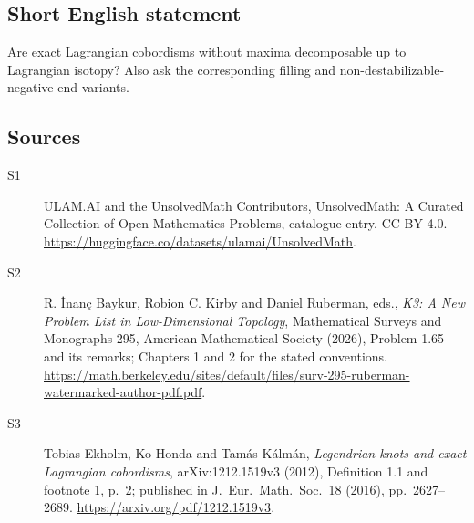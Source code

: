\documentclass[11pt]{article}
\begin{document}
\subsection{Short English statement}
Are exact Lagrangian cobordisms without maxima decomposable up to Lagrangian isotopy? Also ask the corresponding filling and non-destabilizable-negative-end variants.
\subsection{Sources}
\begin{description}
\item[\hypertarget{source:statement:1}{S1}] ULAM.AI and the UnsolvedMath Contributors, UnsolvedMath: A Curated Collection of Open Mathematics Problems, catalogue entry. CC BY 4.0. \url{https://huggingface.co/datasets/ulamai/UnsolvedMath}.
\item[\hypertarget{source:statement:2}{S2}] R. İnanç Baykur, Robion C. Kirby and Daniel Ruberman, eds., \emph{K3: A New Problem List in Low-Dimensional Topology}, Mathematical Surveys and Monographs 295, American Mathematical Society (2026), Problem 1.65 and its remarks; Chapters 1 and 2 for the stated conventions. \url{https://math.berkeley.edu/sites/default/files/surv-295-ruberman-watermarked-author-pdf.pdf}.
\item[\hypertarget{source:statement:3}{S3}] Tobias Ekholm, Ko Honda and Tamás Kálmán, \emph{Legendrian knots and exact Lagrangian cobordisms}, arXiv:1212.1519v3 (2012), Definition 1.1 and footnote 1, p.\ 2; published in J.\ Eur.\ Math.\ Soc.\ 18 (2016), pp.\ 2627--2689. \url{https://arxiv.org/pdf/1212.1519v3}.
\end{description}
\label{end:statement}
\end{document}
